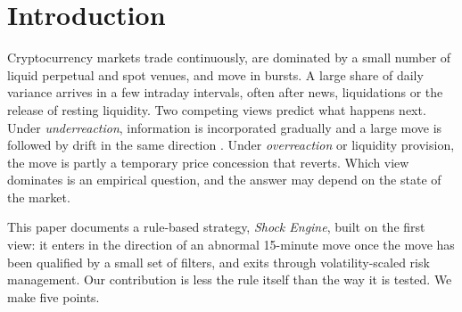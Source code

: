 \documentclass[11pt,a4paper]{article}
\newcommand{\1}{\mathbf{1}}
\begin{document}
\begin{titlepage}
\vfill
{}
\end{titlepage}

\section{Introduction}

Cryptocurrency markets trade continuously, are dominated by a small number of liquid perpetual and spot venues, and move in bursts. A large share of daily variance arrives in a few intraday intervals, often after news, liquidations or the release of resting liquidity. Two competing views predict what happens next. Under \emph{underreaction}, information is incorporated gradually and a large move is followed by drift in the same direction \citep{HongStein1999}. Under \emph{overreaction} or liquidity provision, the move is partly a temporary price concession that reverts. Which view dominates is an empirical question, and the answer may depend on the state of the market.

This paper documents a rule-based strategy, \emph{Shock Engine}, built on the first view: it enters in the direction of an abnormal 15-minute move once the move has been qualified by a small set of filters, and exits through volatility-scaled risk management. Our contribution is less the rule itself than the way it is tested. We make five points.
\end{document}
